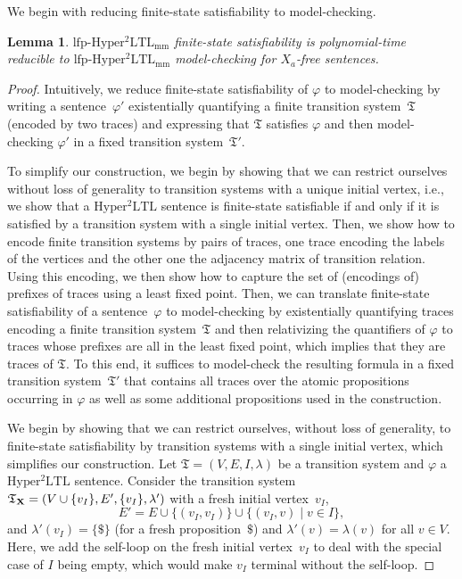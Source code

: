 \documentclass[dvipsnames,10pt,a4paper]{amsart}
\newtheorem{lem}[thm]{Lemma}
\theoremstyle{definition}
\theoremstyle{remark}
\renewcommand{\phi}{\varphi}
\newcommand{\set}[1]{\{#1\}}
\newcommand{\X}{\mathop{\mathbf{X}\vphantom{a}}\nolimits}
\newcommand{\sohyltl}{\mathrm{Hyper^2LTL}\xspace}
\newcommand{\lfpsohyltlfp}{\mathrm{lfp\text{-}{Hyper^2LTL_{\mathrm{mm}}}}\xspace}
\newcommand{\univar}{X_a}
\newcommand{\tsys}{\mathfrak{T}}
\newcommand{\initmark}{I}
\begin{document}
We begin with reducing finite-state satisfiability to model-checking.

\begin{lem}
\label{lemma_fssat2mc}
$\lfpsohyltlfp$ finite-state satisfiability is polynomial-time reducible to $\lfpsohyltlfp$ model-checking for $\univar$-free sentences.
\end{lem}

\begin{proof}
Intuitively, we reduce finite-state satisfiability of $\varphi$ to model-checking by writing a sentence~$\varphi'$ existentially quantifying a finite transition system~$\tsys$ (encoded by two traces) and expressing that $\tsys$ satisfies $\phi$ and then model-checking $\varphi'$ in a fixed transition system~$\tsys'$. 

To simplify our construction, we begin by showing that we can restrict ourselves without loss of generality to transition systems with a unique initial vertex, i.e., we show that a $\sohyltl$ sentence is finite-state satisfiable if and only if it is satisfied by a transition system with a single initial vertex.
Then, we show how to encode finite transition systems by pairs of traces,  one trace encoding the labels of the vertices and the other one the adjacency matrix of transition relation. 
Using this encoding, we then show how to capture the set of (encodings of) prefixes of traces using a least fixed point.
Then, we can translate finite-state satisfiability of a sentence~$\varphi$ to model-checking by existentially quantifying traces encoding a finite transition system~$\tsys$ and then relativizing the quantifiers of $\varphi$ to traces whose prefixes are all in the least fixed point, which implies that they are traces of $\tsys$.
To this end, it suffices to model-check the resulting formula in a fixed transition system~$\tsys'$ that contains all traces over the atomic propositions occurring in $\varphi$ as well as some additional propositions used in the construction.

We begin by showing that we can restrict ourselves, without loss of generality, to finite-state satisfiability by transition systems with a single initial vertex, which simplifies our construction.
Let $\tsys = (V, E, I, \lambda)$ be a transition system and $\phi$ a $\sohyltl$ sentence.
Consider the transition system~$\tsys_{\X} = (V\cup\set{v_\initmark}, E', \set{v_\initmark}, \lambda')$ with a fresh initial vertex~$v_\initmark$,
\[
E' = E \cup \set{(v_\initmark, v_\initmark)} \cup \set{(v_\initmark, v) \mid v \in I},
\]
and $\lambda'(v_\initmark) = \set{\$}$ (for a fresh proposition~$\$$) and $\lambda'(v) = \lambda(v)$ for all $v \in V$.
Here, we add the self-loop on the fresh initial vertex~$v_\initmark$ to deal with the special case of $I$ being empty, which would make $v_\initmark$ terminal without the self-loop.


\end{proof}
\end{document}
